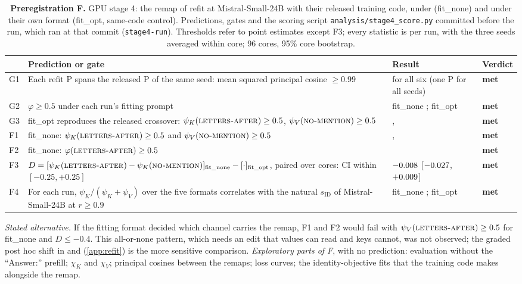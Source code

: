 \begin{table}[!ht]
\centering
\footnotesize
\caption{\textbf{Preregistration F.} GPU stage 4: the remap of \citet{anonymous2026fitted} refit at Mistral-Small-24B with their released training code, under \fmtNone{} (fit\_none) and under their own format (fit\_opt, same-code control). Predictions, gates and the scoring script \texttt{analysis/stage4\_score.py} committed before the run, which ran at that commit (\texttt{stage4-run}). Thresholds refer to point estimates except F3; every statistic is per run, with the three seeds averaged within core; 96 cores, 95\% core bootstrap.}
\label{tab:prereg-f}
\begin{tabular}{p{}p{}p{}p{}}
\toprule
 & Prediction or gate & Result & Verdict \\
\midrule
G1 & Each refit P spans the released P of the same seed: mean squared principal cosine $\geq 0.99$ & {} for all six (one P for all seeds) & \textbf{met} \\
G2 & $\varphi \geq 0.5$ under each run's fitting prompt & fit\_none \phiNoneRefNone{}; fit\_opt \phiOptRefOpt{} & \textbf{met} \\
G3 & fit\_opt reproduces the released crossover: $\psi_K(\text{\textsc{letters-after}{}}) \geq 0.5$, $\psi_V(\text{\textsc{no-mention}{}}) \geq 0.5$ & \psiLetterRefOpt{}, \psiVNoneRefOpt{} & \textbf{met} \\
\midrule
F1 & fit\_none: $\psi_K(\text{\textsc{letters-after}{}}) \geq 0.5$ and $\psi_V(\text{\textsc{no-mention}{}}) \geq 0.5$ & \psiLetterRefNone{}, \psiVNoneRefNone{} & \textbf{met} \\
F2 & fit\_none: $\varphi(\text{\textsc{letters-after}{}}) \geq 0.5$ & \phiLetterRefNone{} & \textbf{met} \\
F3 & $D = [\psi_K(\text{\textsc{letters-after}{}}) - \psi_K(\text{\textsc{no-mention}{}})]_{\text{fit\_none}} - [\cdot]_{\text{fit\_opt}}$, paired over cores: CI within $[-0.25, +0.25]$ & $-0.008{}$ [$-0.027{}$, $+0.009{}$] & \textbf{met} \\
F4 & For each run, $\psi_K/(\psi_K+\psi_V)$ over the five formats correlates with the natural $s_{\mathrm{ID}}$ of Mistral-Small-24B at $r \geq 0.9$ & fit\_none {}; fit\_opt {} & \textbf{met} \\
\bottomrule
\end{tabular}

\smallskip
\begin{minipage}{0.94\textwidth}
\footnotesize
\emph{Stated alternative.} If the fitting format decided which channel carries the remap, F1 and F2 would fail with $\psi_V(\text{\textsc{letters-after}{}}) \geq 0.5$ for fit\_none and $D \leq -0.4$. This all-or-none pattern, which needs an edit that values can read and keys cannot, was not observed; the graded post hoc shift in \fmtOpt{} and \fmtPost{} (\cref{app:refit}) is the more sensitive comparison. \emph{Exploratory parts of F}, with no prediction: evaluation without the ``Answer:'' prefill; $\chi_K$ and $\chi_V$; principal cosines between the remaps; loss curves; the identity-objective fits that the training code makes alongside the remap.
\end{minipage}
\end{table}

